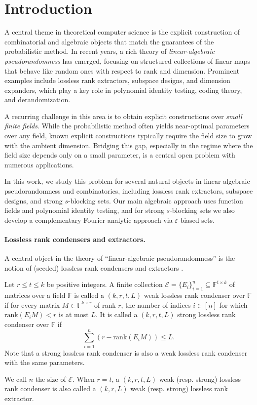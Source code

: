 \documentclass[11pt]{article}
\newcommand{\eps}{\varepsilon}
\newcommand{\rank}{\mathrm{rank}}
\newcommand{\F}{\mathbb{F}}
\begin{document}
\section{Introduction}

A central theme in theoretical computer science is the explicit construction of combinatorial and algebraic objects that match the guarantees of the probabilistic method. In recent years, a rich theory of \emph{linear-algebraic pseudorandomness} has emerged, focusing on structured collections of linear maps that behave like random ones with respect to rank and dimension. Prominent examples include lossless rank extractors, subspace designs, and dimension expanders, which play a key role in polynomial identity testing, coding theory, and derandomization.

A recurring challenge in this area is to obtain explicit constructions over \emph{small finite fields}. While the probabilistic method often yields near-optimal parameters over any field, known explicit constructions typically require the field size to grow with the ambient dimension. Bridging this gap, especially in the regime where the field size depends only on a small parameter, is a central open problem with numerous applications.

In this work, we study this problem for several natural objects in linear-algebraic pseudorandomness and combinatorics, including lossless rank extractors, subspace designs, and strong $s$-blocking sets. Our main algebraic approach uses function fields and polynomial identity testing, and for strong $s$-blocking sets we also develop a complementary Fourier-analytic approach via $\eps$-biased sets.

\paragraph{Lossless rank condensers and extractors.}

A central object in the theory of ``linear-algebraic pseudorandomness'' \cite{FG15} is the notion of (seeded) lossless rank condensers and extractors \cite{GR08,FS12,FSS14,FG15}.

\begin{definition}\label{def:rank-condenser}
Let $r \le t \le k$ be positive integers. A finite collection $\mathcal{E}=\{E_i\}_{i=1}^n \subseteq \F^{t\times k}$ of matrices over a field $\F$ is called a $(k,r,t,L)$ weak lossless rank condenser over $\F$ if for every matrix $M \in \F^{k \times r}$ of rank $r$, the number of indices $i\in [n]$ for which $\rank(E_i M) < r$ is at most $L$.
It is called a $(k,r,t,L)$ strong lossless rank condenser over $\F$ if 
\[
\sum_{i=1}^n (r-\rank(E_i M))\leq L.
\] 
Note that a strong lossless rank condenser is also a weak lossless rank condenser with the same parameters.

We call $n$ the size of $\mathcal{E}$.
When $r=t$, a $(k,r,t,L)$ weak (resp. strong) lossless rank condenser is also called a $(k,r,L)$ weak (resp. strong) lossless rank extractor.
\end{definition}
\end{document}
